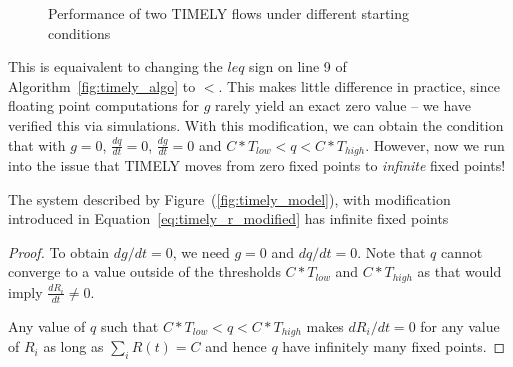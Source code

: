 \begin{figure}[t]
\center
{}
\caption{Performance of two TIMELY flows under different starting conditions}
\label{fig:timely_unstable}
\end{figure}

This is equaivalent to changing the $leq$ sign on line 9 of
Algorithm~\ref{fig:timely_algo} to $<$. This makes little difference in
practice, since floating point computations for $g$ rarely yield an exact zero
value -- we have verified this via simulations. With this modification, we can
obtain the condition that with $g =0$, $\tfrac{dq}{dt} = 0$, $\tfrac{dg}{dt} =
0$ and $C*T_{low} < q < C*T_{high}$. However, now we run into the issue that
TIMELY moves from zero fixed points to \emph{infinite} fixed points!

\begin{thm}
The system described by Figure~(\ref{fig:timely_model}), with
modification introduced in Equation~\ref{eq:timely_r_modified} has
infinite fixed points
\end{thm}
\begin{proof}
To obtain ${dg}/{dt} =0$, we need $g = 0$ and ${dq}/{dt} = 0$.  Note that $q$
cannot converge to a value outside of the thresholds $ C*{T_{low}}$ and
$C*{T_{high}}$ as that would imply $\frac{dR_i}{dt} \ne 0$.

Any value of $q$ such that $C*T_{low} < q < C*T_{high}$ makes ${dR_i}/{dt} = 0$
for any value of $R_i$ as long as $\sum_{i} R(t) =  C$ and hence $q$ have
infinitely many fixed points. 
\end{proof}

